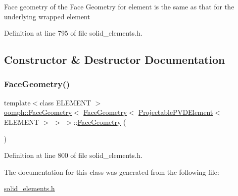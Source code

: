Face geometry of the Face Geometry for element is the same as that for the underlying wrapped element 

Definition at line 795 of file solid\+\_\+elements.\+h.



\subsection{Constructor \& Destructor Documentation}
\mbox{\label{classoomph_1_1FaceGeometry_3_01FaceGeometry_3_01ProjectablePVDElement_3_01ELEMENT_01_4_01_4_01_4_a81374c0c38495f04c4ab99e62e1b1195}} 
\subsubsection{\texorpdfstring{Face\+Geometry()}{FaceGeometry()}}
{\footnotesize\ttfamily template$<$class E\+L\+E\+M\+E\+NT $>$ \\
\hyperlink{classoomph_1_1FaceGeometry}{oomph\+::\+Face\+Geometry}$<$ \hyperlink{classoomph_1_1FaceGeometry}{Face\+Geometry}$<$ \hyperlink{classoomph_1_1ProjectablePVDElement}{Projectable\+P\+V\+D\+Element}$<$ E\+L\+E\+M\+E\+NT $>$ $>$ $>$\+::\hyperlink{classoomph_1_1FaceGeometry}{Face\+Geometry} (\begin{DoxyParamCaption}{ }\end{DoxyParamCaption})\hspace{0.3cm}{\ttfamily [inline]}}



Definition at line 800 of file solid\+\_\+elements.\+h.



The documentation for this class was generated from the following file\+:\begin{DoxyCompactItemize}
\item 
\hyperlink{solid__elements_8h}{solid\+\_\+elements.\+h}\end{DoxyCompactItemize}
